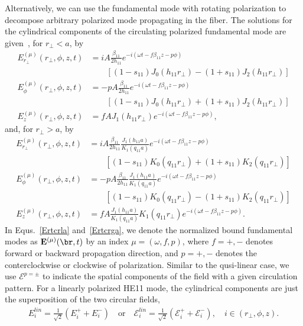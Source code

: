 \documentclass[]{report}
\begin{document}
Alternatively, we can use the fundamental mode with rotating polarization to decompose arbitrary polarized mode propagating in the fiber. The solutions for the cylindrical components of the circulating polarized fundamental mode are given~\cite{Lacroute2012,Vetsch2010a}, for $ r_\perp<a $, by
\begin{subequations}
\label{Ertcrla}
\begin{align}
E^{(\mu)}_{r_\perp}(r_\perp,\phi,z,t) &=iA\frac{\beta_{11}}{2h_{11}}e^{-i(\omega t-f\beta_{11} z -p\phi)}\nonumber\\
&\qquad \left[ (1-s_{11})J_0(h_{11}r_\perp)-(1+s_{11})J_2(h_{11}r_\perp) \right]\\
E^{(\mu)}_\phi(r_\perp,\phi,z,t) &=  -pA \frac{\beta_{11}}{2h_{11}}e^{-i(\omega t-f\beta_{11} z -p\phi)} \nonumber\\
&\qquad \left[ (1-s_{11})J_0(h_{11}r_\perp) +(1+s_{11})J_2(h_{11}r_\perp) \right] \\
E^{(\mu)}_z(r_\perp,\phi,z,t) &= fA J_1(h_{11}r_\perp) e^{-i(\omega t-f\beta_{11} z -p\phi)},
\end{align}
\end{subequations}
and, for $ r_\perp>a $, by
\begin{subequations}
\label{Ertcrga}
\begin{align}
E^{(\mu)}_{r_\perp}(r_\perp,\phi,z,t) &=iA\frac{\beta_{11}}{2h_{11}}\frac{J_1(h_{11}a)}{K_1(q_{11}a)}e^{-i(\omega t-f\beta_{11} z -p\phi)} \nonumber\\ 
&\qquad \left[ (1-s_{11})K_0(q_{11}r_\perp)+(1+s_{11})K_2(q_{11}r_\perp) \right]\\
E^{(\mu)}_\phi(r_\perp,\phi,z,t) &=  -pA \frac{\beta_{11}}{2h_{11}} \frac{J_1(h_{11}a)}{K_1(q_{11}a)}e^{-i(\omega t-f\beta_{11} z -p\phi)} \nonumber\\ 
&\qquad \left[ (1-s_{11})K_0(q_{11}r_\perp) - (1+s_{11})K_2(q_{11}r_\perp) \right] \\
E^{(\mu)}_z(r_\perp,\phi,z,t) &= fA \frac{J_1(h_{11}a)}{K_1(q_{11}a)} K_1(q_{11}r_\perp) e^{-i(\omega t-f\beta_{11} z -p\phi)}.
\end{align}
\end{subequations}
In Equs.~\ref{Ertcrla} and~\ref{Ertcrga}, we denote the normalized bound fundamental modes as $ \mathbf{E}^{(\mu)} (\br,t)$ by an index $ \mu=(\omega,f,p) $, where $ f=+,- $ denotes forward or backward propagation direction, and $ p=+,- $ denotes the conterclockwise or clockwise of polarization. Similar to the qusi-linear case, we use $ \boldsymbol{\mathcal{E}}^{p=\pm} $ to indicate the spatial components of the field with a given circulation pattern. For a linearly polarized HE11 mode, the cylindrical components are just the superposition of the two circular fields, 
\begin{align}\label{Eilincyc}
E_i^{lin} = \frac{1}{\sqrt{2}}(E_i^+ + E_i^-)\quad \mathrm{or}\quad \mathcal{E}_i^{lin} = \frac{1}{\sqrt{2}}(\mathcal{E}_i^+ + \mathcal{E}_i^-),\quad i\in(r_\perp,\phi,z).
\end{align}
\end{document}
